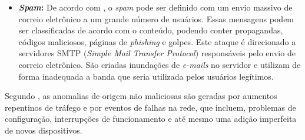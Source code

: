 \begin{itemize}
  \item \textbf{\textit{Spam}:} De acordo com , o \textit{spam} pode ser definido com um envio massivo de correio eletrônico a um grande número de usuários. Essas mensagens podem ser classificadas de acordo com o conteúdo, podendo conter propagandas, códigos maliciosos, páginas de \textit{phishing} e golpes. Este ataque é direcionado a servidores SMTP (\textit{Simple Mail Transfer Protocol}) responsáveis pelo envio de correio eletrônico. São criadas inundações de \textit{e-mails} no servidor e utilizam de forma inadequada a banda que seria utilizada pelos usuários legítimos.
  \end{itemize}

\indent Segundo , as anomalias de origem não maliciosas são geradas por aumentos repentinos de tráfego e por eventos de falhas na rede, que incluem, problemas de configuração, interrupções de funcionamento e até mesmo uma adição imperfeita de novos dispositivos.

